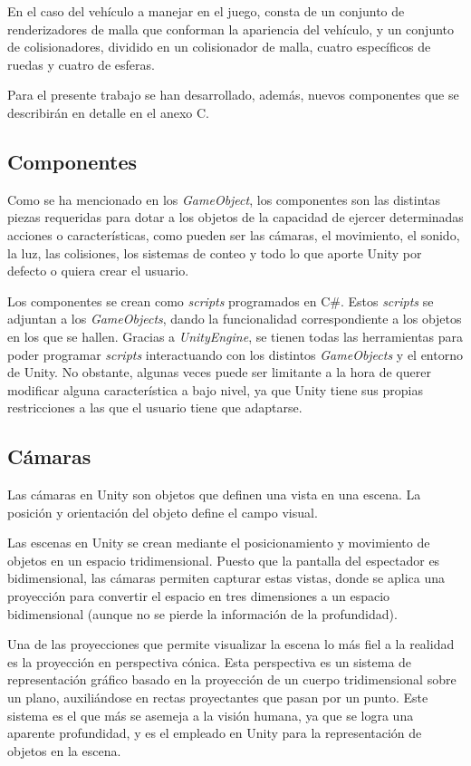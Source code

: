 En el caso del vehículo a manejar en el juego, consta de un conjunto de renderizadores de malla que conforman la apariencia del vehículo, y un conjunto de colisionadores, dividido en un colisionador de malla, cuatro específicos de ruedas y cuatro de esferas.

Para el presente trabajo se han desarrollado, además, nuevos componentes que se describirán en detalle en el anexo C.

\subsection{Componentes}

Como se ha mencionado en los \textit{GameObject}, los componentes son las distintas piezas requeridas para dotar a los objetos de la capacidad de ejercer determinadas acciones o características, como pueden ser las cámaras, el movimiento, el sonido, la luz, las colisiones, los sistemas de conteo y todo lo que aporte Unity por defecto o quiera crear el usuario.

Los componentes se crean como \textit{scripts} programados en C\#. Estos \textit{scripts} se adjuntan a los \textit{GameObjects}, dando la funcionalidad correspondiente a los objetos en los que se hallen. Gracias a \textit{UnityEngine}, se tienen todas las herramientas para poder programar \textit{scripts} interactuando con los distintos \textit{GameObjects} y el entorno de Unity. No obstante, algunas veces puede ser limitante a la hora de querer modificar alguna característica a bajo nivel, ya que Unity tiene sus propias restricciones a las que el usuario tiene que adaptarse.

\subsection{Cámaras}

Las cámaras en Unity son objetos que definen una vista en una escena. La posición y orientación del objeto define el campo visual.

Las escenas en Unity se crean mediante el posicionamiento y movimiento de objetos en un espacio tridimensional. Puesto que la pantalla del espectador es bidimensional, las cámaras permiten capturar estas vistas, donde se aplica una proyección para convertir el espacio en tres dimensiones a un espacio bidimensional (aunque no se pierde la información de la profundidad).

Una de las proyecciones que permite visualizar la escena lo más fiel a la realidad es la proyección en perspectiva cónica. Esta perspectiva es un sistema de representación gráfico basado en la proyección de un cuerpo tridimensional sobre un plano, auxiliándose en rectas proyectantes que pasan por un punto. Este sistema es el que más se asemeja a la visión humana, ya que se logra una aparente profundidad, y es el empleado en Unity para la representación de objetos en la escena.

